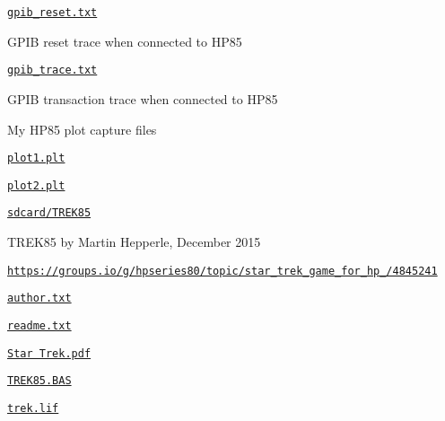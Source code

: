 \begin{DoxyItemize}
\begin{DoxyItemize}
\begin{DoxyItemize}
\end{DoxyItemize}
\item \href{sdcard/gpib_reset.txt}{\tt gpib\+\_\+reset.\+txt}
\begin{DoxyItemize}
\item G\+P\+IB reset trace when connected to H\+P85
\end{DoxyItemize}
\item \href{sdcard/gpib_trace.txt}{\tt gpib\+\_\+trace.\+txt}
\begin{DoxyItemize}
\item G\+P\+IB transaction trace when connected to H\+P85
\end{DoxyItemize}
\end{DoxyItemize}
\item My H\+P85 plot capture files
\begin{DoxyItemize}
\item \href{sdcard/plot1.plt}{\tt plot1.\+plt}
\item \href{sdcard/plot2.plt}{\tt plot2.\+plt}
\end{DoxyItemize}
\item \href{sdcard/TREK85}{\tt sdcard/\+T\+R\+E\+K85}
\begin{DoxyItemize}
\item T\+R\+E\+K85 by Martin Hepperle, December 2015
\item \href{https://groups.io/g/hpseries80/topic/star_trek_game_for_hp_85/4845241}{\tt https\+://groups.\+io/g/hpseries80/topic/star\+\_\+trek\+\_\+game\+\_\+for\+\_\+hp\+\_/4845241}
\begin{DoxyItemize}
\item \href{sdcard/TREK85/author.txt}{\tt author.\+txt}
\item \href{sdcrad/TREK85/readme.txt}{\tt readme.\+txt}
\item \href{sdcard/TREK85/Start Trek.pdf}{\tt Star Trek.\+pdf}
\item \href{sdcrad/TREK85/TREK85.BAS}{\tt T\+R\+E\+K85.\+B\+AS}
\item \href{sdcard/TREK85/trek.lif}{\tt trek.\+lif}
\end{DoxyItemize}
\end{DoxyItemize}
\end{DoxyItemize}



 